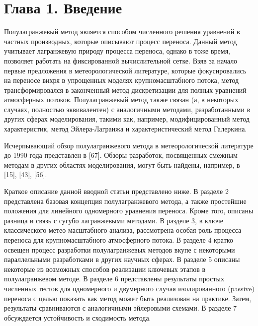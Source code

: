 \chapter*{Глава 1. Введение} \label{chapt1}

Полулагранжевый метод является способом численного решения уравнений в частных производных, которые описывают процесс переноса. Данный метод учитывает лагранжевую природу процесса переноса, однако в тоже время, позволяет работать на фиксированной вычислительной сетке. Взяв за начало первые предложения в метеорологической литературе, которые фокусировались на переносе вихря в упрощенных моделях крупномасштабного потока, метод трансформировался в законченный метод дискретизации для полных уравнений атмосферных потоков. Полулагранжевый метод также связан (а, в некоторых случаях, полностью эквивалентен) с аналогичными методами, разработанными в других сферах моделирования, такими как, например, модифицированный метод характеристик, метод Эйлера-Лагранжа и характеристический метод Галеркина. 

Исчерпывающий обзор полулагранжевого метода в метеорологической литературе до 1990 года представлен в [67]. Обзоры разработок, посвященных смежным методам в других областях моделирования, могут быть найдены, например, в [15], [43], [56].

Краткое описание данной вводной статьи представлено ниже. В разделе 2 представлена базовая концепция полулагранжевого метода, а также простейшие положения для линейного одномерного уравнения переноса. Кроме того, описаны разница и связь с сугубо лагранжевыми методами. В разделе 3, в ключе классического метео масштабного анализа, рассмотрена особая роль процесса переноса для крупномасштабного атмосферного потока. В разделе 4 кратко освещен процесс разработки полулагранжевых методов вкупе с некоторыми параллельными разработками в других научных сферах. В разделе 5 описаны некоторые из возможных способов реализации ключевых этапов в полулагранжевом методе. В разделе 6 представлены результаты простых численных тестов для одномерного и двумерного случая изолированного (passive) переноса с целью показать как метод может быть реализован на практике. Затем, результаты сравниваются с аналогичными эйлеровыми схемами. В разделе 7 обсуждается устойчивость и сходимость метода.

